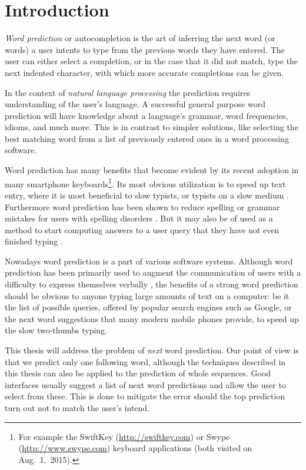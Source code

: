 \chapter{Introduction}
\label{ch:introduction}

\emph{Word prediction} or autocompletion is the art of inferring the next
word (or words) a user intents to type from the previous words they have
entered.
The user can either select a completion, or in the case that it did not
match, type the next indented character, with which more accurate completions
can be given.

In the context of \emph{natural language processing} the prediction requires
understanding of the user's language.
A successful general purpose word prediction will have knowledge about a
language's grammar, word frequencies, idioms, and much more.
This is in contrast to simpler solutions, like selecting the best matching word
from a list of previously entered ones in a word processing software.

Word prediction has many benefits that become evident by its recent adoption
in many smartphone keyboards\footnote{For example the SwiftKey
(\url{http://swiftkey.com}) or Swype (\url{http://www.swype.com}) keyboard
applications (both visited on Aug.~1,~2015).}.
Its most obvious utilization is to speed up text entry, where it is most
beneficial to slow typists, or typists on a slow medium \parencite{Trnka2007}.
Furthermore word prediction has been shown to reduce spelling or grammar
mistakes for users with spelling disorders \parencite{Newell1992}.
But it may also be of used as a method to start computing answers to a user
query that they have not even finished typing \noref.

Nowadays word prediction is a part of various software systems.
Although word prediction has been primarily used to augment the communication of
users with a difficulty to express themselves verbally
\parencite{Swiffin1987,Trnka2011}, the benefits of a strong word prediction
should be obvious to anyone typing large amounts of text on a computer:
be it the list of possible queries, offered by popular search engines such as
Google, or the next word suggestions that many modern mobile phones provide, to
speed up the slow two-thumbs typing.

This thesis will address the problem of \emph{next} word prediction.
Our point of view is that we predict only one following word, although the
techniques described in this thesis can also be applied to the prediction
of whole sequences.
Good interfaces usually suggest a list of next word predictions and allow the
user to select from these.
This is done to mitigate the error should the top prediction turn out not to
match the user's intend.

